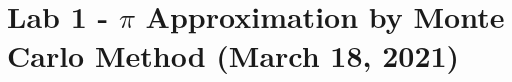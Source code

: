 \section*{\Large{\textbf{Lab 1 - $\pi$ Approximation by Monte Carlo Method}} \small{(March 18, 2021)}}
\label{sec:lab-1}